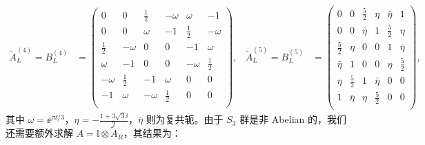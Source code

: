 \begin{align}
  \tilde{A}^{(4)}_L = B^{(4)}_L &= \begin{pmatrix}
    0 & 0 & \frac12 & -\omega & \omega & -1 \\
    0 & 0 & \omega & -1 & \frac12 & -\omega \\
    \frac12 & -\omega & 0 & 0 & -1 & \omega \\
    \omega & -1 & 0 & 0 & -\omega & \frac12 \\
    -\omega & \frac12 & -1 & \omega & 0 & 0 \\
    -1 & \omega & -\omega & \frac12 & 0 & 0 \\
  \end{pmatrix}, &
  \tilde{A}^{(5)}_L = B^{(5)}_L &= \begin{pmatrix}
    0 & 0 & \frac52 & \eta & \bar{\eta} & 1 \\
    0 & 0 & \bar{\eta} & 1 & \frac52 & \eta \\
    \frac52 & \eta & 0 & 0 & 1 & \bar{\eta} \\
    \bar{\eta} & 1 & 0 & 0 & \eta & \frac52 \\
    \eta & \frac52 & 1 & \bar{\eta} & 0 & 0 \\
    1 & \bar{\eta} & \eta & \frac52 & 0 & 0 \\
  \end{pmatrix},
\end{align}
其中 $\omega=\ee^{\pi\ii/3}$，$\eta=-\frac{1+3\sqrt3\ii}{2}$，$\bar{\eta}$ 则为复共轭。由于 $S_3$ 群是非 Abelian 的，我们还需要额外求解 $A=\mathbb{I}\otimes\tilde{A}_R$，其结果为：
